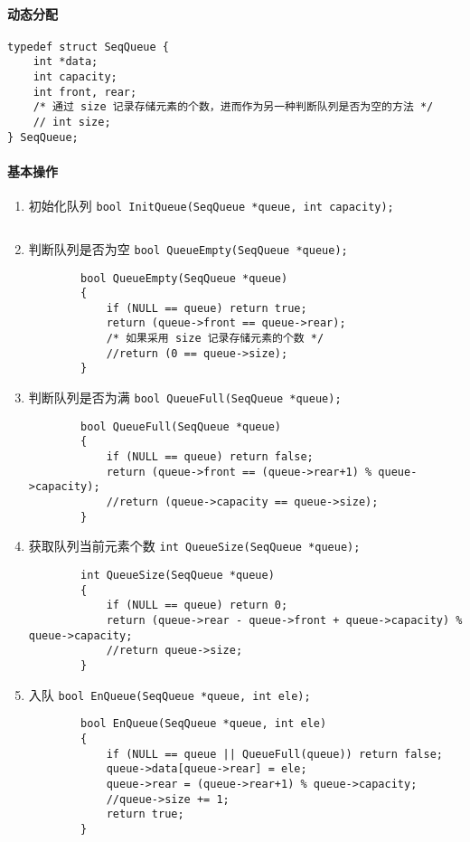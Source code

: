 \documentclass{ctexart}
\begin{document}
\paragraph{动态分配}
\begin{verbatim}
typedef struct SeqQueue {
    int *data;
    int capacity;
    int front, rear;
    /* 通过 size 记录存储元素的个数，进而作为另一种判断队列是否为空的方法 */
    // int size;
} SeqQueue;
\end{verbatim}

\paragraph{基本操作}
\begin{enumerate}
    \item 初始化队列 \texttt{bool InitQueue(SeqQueue *queue, int capacity);}
        \inputminted{c}{codes/init-sequence-queue.c}

    \item 判断队列是否为空 \texttt{bool QueueEmpty(SeqQueue *queue);}
        \begin{verbatim}
        bool QueueEmpty(SeqQueue *queue)
        {
            if (NULL == queue) return true;
            return (queue->front == queue->rear);
            /* 如果采用 size 记录存储元素的个数 */
            //return (0 == queue->size);
        }
        \end{verbatim}

    \item 判断队列是否为满 \texttt{bool QueueFull(SeqQueue *queue);}
        \begin{verbatim}
        bool QueueFull(SeqQueue *queue)
        {
            if (NULL == queue) return false;
            return (queue->front == (queue->rear+1) % queue->capacity);
            //return (queue->capacity == queue->size);
        }
        \end{verbatim}

    \item 获取队列当前元素个数 \texttt{int QueueSize(SeqQueue *queue);}
        \begin{verbatim}
        int QueueSize(SeqQueue *queue)
        {
            if (NULL == queue) return 0;
            return (queue->rear - queue->front + queue->capacity) % queue->capacity;
            //return queue->size;
        }
        \end{verbatim}

    \item 入队 \texttt{bool EnQueue(SeqQueue *queue, int ele);}
        \begin{verbatim}
        bool EnQueue(SeqQueue *queue, int ele)
        {
            if (NULL == queue || QueueFull(queue)) return false;
            queue->data[queue->rear] = ele;
            queue->rear = (queue->rear+1) % queue->capacity;
            //queue->size += 1;
            return true;
        }
        \end{verbatim}


\end{enumerate}
\end{document}
